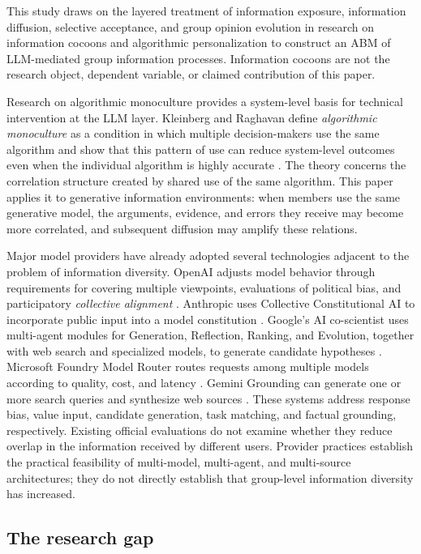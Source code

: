 \documentclass[11pt,a4paper]{article}
\newcommand{\term}[1]{\textit{#1}}
\begin{document}
This study draws on the layered treatment of information exposure, information diffusion, selective acceptance, and group opinion evolution in research on information cocoons and algorithmic personalization to construct an ABM of LLM-mediated group information processes. Information cocoons are not the research object, dependent variable, or claimed contribution of this paper.

Research on algorithmic monoculture provides a system-level basis for technical intervention at the LLM layer. Kleinberg and Raghavan define \term{algorithmic monoculture} as a condition in which multiple decision-makers use the same algorithm and show that this pattern of use can reduce system-level outcomes even when the individual algorithm is highly accurate \cite{kleinberg2021}. The theory concerns the correlation structure created by shared use of the same algorithm. This paper applies it to generative information environments: when members use the same generative model, the arguments, evidence, and errors they receive may become more correlated, and subsequent diffusion may amplify these relations.

Major model providers have already adopted several technologies adjacent to the problem of information diversity. OpenAI adjusts model behavior through requirements for covering multiple viewpoints, evaluations of political bias, and participatory \term{collective alignment} \cite{openai2025a,openai2025b}. Anthropic uses Collective Constitutional AI to incorporate public input into a model constitution \cite{anthropic2023}. Google's AI co-scientist uses multi-agent modules for Generation, Reflection, Ranking, and Evolution, together with web search and specialized models, to generate candidate hypotheses \cite{gottweis2025}. Microsoft Foundry Model Router routes requests among multiple models according to quality, cost, and latency \cite{microsoft2026}. Gemini Grounding can generate one or more search queries and synthesize web sources \cite{google2026}. These systems address response bias, value input, candidate generation, task matching, and factual grounding, respectively. Existing official evaluations do not examine whether they reduce overlap in the information received by different users. Provider practices establish the practical feasibility of multi-model, multi-agent, and multi-source architectures; they do not directly establish that group-level information diversity has increased.

\subsection{The research gap}
\end{document}
